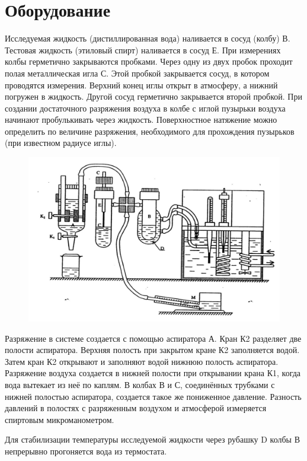 \section{Оборудование}

Исследуемая жидкость (дистиллированная вода) наливается в сосуд (колбу) В. Тестовая жидкость  (этиловый спирт) наливается  в сосуд Е.  При измерениях  колбы герметично закрываются  пробками.   Через одну из двух пробок  проходит полая металлическая игла С. Этой пробкой закрывается сосуд, в котором  проводятся измерения. Верхний конец иглы открыт в атмосферу, а нижний погружен в жидкость. Другой сосуд герметично закрывается второй пробкой. При создании достаточного  разряжения воздуха в колбе с иглой пузырьки воздуха начинают пробулькивать через жидкость. Поверхностное натяжение можно определить по величине разряжения, необходимого для прохождения пузырьков (при известном радиусе иглы).

\begin{figure}[ht!]
    \centering\includegraphics[width=0.8\linewidth]{img/img1.png}
\end{figure}

Разряжение в системе создается с помощью аспиратора А. Кран К2 разделяет две полости аспиратора. Верхняя полость при закрытом кране К2  заполняется водой. Затем кран К2 открывают и заполняют водой  нижнюю полость  аспиратора.  Разряжение воздуха создается в нижней полости  при открывании крана К1, когда  вода вытекает из неё по каплям. В колбах В и С, соединённых трубками с нижней полостью аспиратора,  создается такое же пониженное давление. Разность давлений в полостях с разряженным воздухом и атмосферой измеряется спиртовым микроманометром.

Для стабилизации температуры исследуемой жидкости через рубашку D колбы В непрерывно прогоняется вода из термостата.

